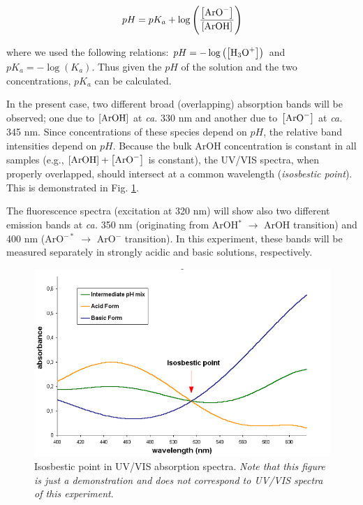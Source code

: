 \documentclass[byrevtex,amssymb,aps,pra,floatfix,letterpaper]{revtex4}
\begin{document}
\begin{equation}
\label{eq12}
pH = pK_a + \log\left(\frac{\left[\textnormal{ArO}^-\right]}{\left[\textnormal{ArOH}\right]}\right)
\end{equation}

\noindent
where we used the following relations: $pH = -\log\left(\left[\textnormal{H}_3\textnormal{O}^+\right]\right)$ and $pK_a = -\log\left(K_a\right)$. Thus given the $pH$ of the solution and the two concentrations, $pK_a$ can be calculated.

In the present case, two different broad (overlapping) absorption bands will be observed; one due to $\left[\textnormal{ArOH}\right]$ at \textit{ca.} 330 nm and another due to $\left[\textnormal{ArO}^-\right]$ at \textit{ca.} 345 nm. Since concentrations of these species depend on $pH$, the relative band intensities depend on $pH$. Because the bulk ArOH concentration is constant in all samples (e.g., $\left[\textnormal{ArOH}\right] + \left[\textnormal{ArO}^-\right]$ is constant), the UV/VIS spectra, when properly overlapped, should intersect at a common wavelength (\textit{isosbestic point}). This is demonstrated in Fig. \ref{fig4}.

The fluorescence spectra (excitation at 320 nm) will show also two different emission bands at \textit{ca.} 350 nm (originating from ArOH$^*$ $\rightarrow$ ArOH transition) and 400 nm (ArO$^{-*}$ $\rightarrow$ ArO$^-$ transition). In this experiment, these bands will be measured separately in strongly acidic and basic solutions, respectively.

\begin{figure}[!htp]
\begin{center}
\includegraphics[scale=0.5]{fig4}
\caption{Isosbestic point in UV/VIS absorption spectra. \textit{Note that this figure is just a demonstration and does not correspond to UV/VIS spectra of this experiment}.}
\label{fig4}
\end{center}
\end{figure}
\end{document}
